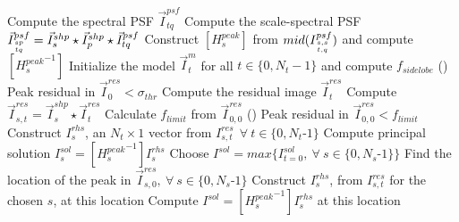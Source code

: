 \documentclass[11pt,a4paper]{article}
\begin{document}
\begin{algorithm}[t!]
  \vspace{0.5cm} 
  {
        { Compute the spectral PSF } $\vec{I}^{psf}_{tq}$\;
	{
		{Compute the scale-spectral PSF} $\vec{I}^{psf}_{{sp}\atop{tq}} = \vec{I}^{shp}_s \star \vec{I}^{shp}_p \star \vec{I}^{psf}_{tq} $\;
	}
  }
  {
     Construct $[{H^{peak}_s}]$ from $mid(I^{psf}_{{s,s}\atop{t,q}})$ and compute $[{H^{peak}_s}^{-1}]$\;
  }
  Initialize the model $\vec{I}^{m}_t$ for all $t \in \{0,N_t-1\}$ and compute $f_{sidelobe}$ \;
  \Repeat () { Peak residual in $\vec{I}^{res}_0 < \sigma_{thr}$ }
  {
    {
      Compute the residual image $\vec{I}^{res}_t$ 
      {
	      Compute $\vec{I}^{res}_{{s},{t}} = \vec{I}^{shp}_s \star \vec{I}^{res}_t$
      }
    }
    Calculate $f_{limit}$ from $\vec{I}^{res}_{0,0}$\;
    \Repeat (){ Peak residual in $\vec{I}^{res}_{0,0} < f_{limit} $ } 
    {
     {
      {
       {
          Construct $I^{rhs}_s$, an $N_t\times 1$ vector from $I^{res}_{s,t} ~~\forall ~ t \in \{0,N_t$-$1\}$\;
          Compute principal solution $I^{sol}_s = [{H^{peak}_s}^{-1}] I^{rhs}_s$\;
       }
       Choose $I^{sol} = max\{I^{sol}_{t=0},~\forall~s\in\{0,N_s$-$1\}\}$ \;
      }
      \Else
      {
       Find the location of the peak in $\vec{I}^{res}_{s,0},~\forall~s\in\{0,N_s$-$1\}$\;
       Construct $I^{rhs}_s$, from $I^{res}_{s,t}$ for the chosen $s$, at this location\;
       Compute $I^{sol} = [{H^{peak}_s}^{-1}] I^{rhs}_s$ at this location\;
}}}}
\end{algorithm}
\end{document}
